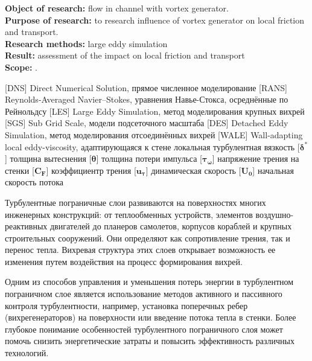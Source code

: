 \textbf{Object of research:} flow in channel with vortex generator.\\
\textbf{Purpose of research:} to research influence of vortex generator on local friction and transport.\\
\textbf{Research methods:} large eddy simulation\\
\textbf{Result:} assessment of the impact on local friction and transport\\
\textbf{Scope:} .\\
\newpage
{}
\begin{acronym}[RANS]
	   [DNS]   {Direct Numerical Solution, прямое численное моделирование}
	  [RANS]  {Reynolds-Averaged Navier–Stokes, уравнения Навье-Стокса, осреднённые по Рейнольдсу}
	   [LES]   {Large Eddy Simulation, метод моделирования крупных вихрей}
	   [SGS]   {Sub Grid Scale, модели подсеточного масштаба}
	   [DES]   {Detached Eddy Simulation, метод моделирования отсоединённых вихрей}
	  [WALE]  {Wall-adapting local eddy-viscosity, адаптирующаяся к стене локальная турбулентная вязкость}
	 [$\boldsymbol{\delta^*}$] {толщина вытеснения}
	 [$\boldsymbol{\theta}$] {толщина потери импульса}
	 [$\boldsymbol{\tau_\omega}$] {напряжение трения на стенки}
	 [$\boldsymbol{C_F}$] {коэффициентр трения}
	 [$\boldsymbol{u_\tau}$] {динамическая скорость}
	 [$\boldsymbol{U_0}$] {начальная скорость потока}
\end{acronym}
\newpage
{}
	
	Турбулентные пограничные слои развиваются на поверхностях многих инженерных конструкций: от теплообменных устройств, элементов воздушно-реактивных двигателей до планеров самолетов, корпусов кораблей и крупных строительных сооружений. Они определяют как сопротивление трения, так и перенос тепла. Вихревая структура этих слоев открывает возможность ее изменения путем воздействия на процесс формирования вихрей. 
	
	Одним из способов управления и уменьшения потерь энергии в турбулентном пограничном слое является использование методов активного и пассивного контроля турбулентности, например, установка поперечных ребер (вихрегенераторов) на поверхности или введение потока тепла в стенки. Более глубокое понимание особенностей турбулентного пограничного слоя может помочь снизить энергетические затраты и повысить эффективность различных технологий.
	
